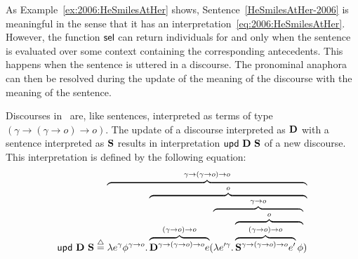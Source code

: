 As Example~\ref{ex:2006:HeSmilesAtHer} shows, Sentence~\eqref{HeSmilesAtHer-2006} is meaningful in the sense that it has an interpretation~\eqref{eq:2006:HeSmilesAtHer}. However, the function $\selK$ can return individuals for  and  only when the sentence is evaluated over some context containing the corresponding antecedents. This happens when the sentence is uttered in a discourse. The pronominal anaphora can then be resolved during the update of the meaning of the discourse with the meaning of the sentence. 

Discourses in~\cite{deGroote:2006:Towards-a-Montagovian-Account-of-Dynamics} are, like sentences, interpreted as terms of type $(\gamma \rightarrow (\gamma \rightarrow o) \rightarrow o)$.  The update of a discourse interpreted as $\D$ with a sentence interpreted as $\S$ results in interpretation $\updt \ \D \ \S$ of a new discourse. This interpretation is defined by the following equation:
\begin{align}
\updt \ \D \ \S \defeq \overbrace{\lambda e^{\gamma} \phi^{\gamma \rightarrow o}. \overbrace{ \overbrace{\D^{\gamma \rightarrow (\gamma \rightarrow o) \rightarrow o}  e}^{(\gamma \rightarrow o) \rightarrow o} (\overbrace{\lambda e'^{\gamma}. \overbrace{\overbrace{\S^{\gamma \rightarrow (\gamma \rightarrow o) \rightarrow o}  e'}^{ (\gamma \rightarrow o) \rightarrow o} \phi}^{o}}^{\gamma \rightarrow o})}^{o}}^{\gamma \rightarrow (\gamma \rightarrow o) \rightarrow o} \label{eq:updtDS:2006}
\end{align}

